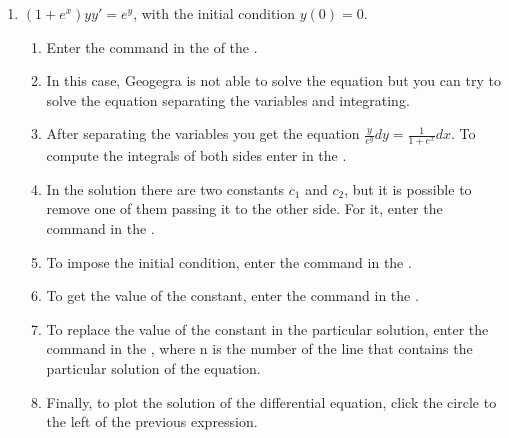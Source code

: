 \begin{enumerate}[leftmargin=*]
\begin{enumerate}
      \item $(1+e^x)yy'=e^y$, with the initial condition $y(0)=0$.
            \begin{indication}
            \begin{enumerate}
            \item Enter the command  in the  of the .
            \item In this case, Geogegra is not able to solve the equation but you can try to solve the equation separating the variables and integrating.
            \item After separating the variables you get the equation $\frac{y}{e^y}dy = \frac{1}{1+e^x}dx$.
                  To compute the integrals of both sides enter  in the .
            \item In the solution there are two constants $c_1$ and $c_2$, but it is possible to remove one of them passing it to the other side. For it, enter the command  in the .
            \item To impose the initial condition, enter the command  in the .
            \item To get the value of the constant, enter the command  in the .
            \item To replace the value of the constant in the particular solution, enter the command  in the , where n  is the number of the line that contains the particular solution of the equation.
            \item Finally, to plot the solution of the differential equation, click the circle to the left of the previous expression.
            \end{enumerate}
            \end{indication}
      \end{enumerate}



\end{enumerate}
